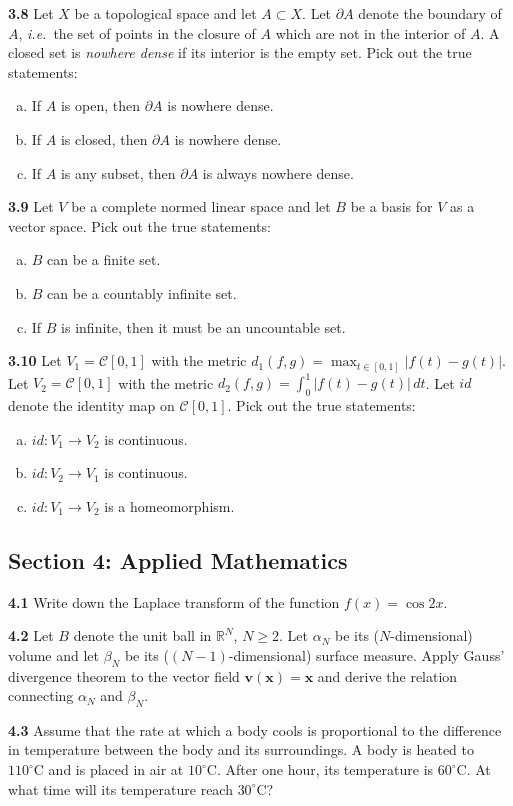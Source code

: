 \documentclass[11pt,a4paper]{article}
\newcommand{\R}{\mathbb{R}}
\newcommand{\examsec}[1]{%
  \subsection*{#1}
  \vspace{-2pt}
}
\newcommand{\qitem}[1]{\par\medskip\noindent\textbf{#1}\hspace{0.5em}}
\begin{document}
\qitem{3.8} Let $X$ be a topological space and let $A \subset X$. Let $\partial A$ denote the boundary of $A$, \emph{i.e.}\ the set of points in the closure of $A$ which are not in the interior of $A$. A closed set is \emph{nowhere dense} if its interior is the empty set. Pick out the true statements:
\begin{enumerate}[(a)]
  \item If $A$ is open, then $\partial A$ is nowhere dense.
  \item If $A$ is closed, then $\partial A$ is nowhere dense.
  \item If $A$ is any subset, then $\partial A$ is always nowhere dense.
\end{enumerate}

\qitem{3.9} Let $V$ be a complete normed linear space and let $B$ be a basis for $V$ as a vector space. Pick out the true statements:
\begin{enumerate}[(a)]
  \item $B$ can be a finite set.
  \item $B$ can be a countably infinite set.
  \item If $B$ is infinite, then it must be an uncountable set.
\end{enumerate}

\qitem{3.10} Let $V_1 = \mathcal{C}[0, 1]$ with the metric $d_1(f, g) = \max_{t \in [0, 1]} |f(t) - g(t)|$. Let $V_2 = \mathcal{C}[0, 1]$ with the metric $d_2(f, g) = \int_0^1 |f(t) - g(t)|\,dt$. Let $id$ denote the identity map on $\mathcal{C}[0, 1]$. Pick out the true statements:
\begin{enumerate}[(a)]
  \item $id : V_1 \to V_2$ is continuous.
  \item $id : V_2 \to V_1$ is continuous.
  \item $id : V_1 \to V_2$ is a homeomorphism.
\end{enumerate}

\examsec{Section 4: Applied Mathematics}

\qitem{4.1} Write down the Laplace transform of the function $f(x) = \cos 2x$.

\qitem{4.2} Let $B$ denote the unit ball in $\R^N$, $N \ge 2$. Let $\alpha_N$ be its ($N$-dimensional) volume and let $\beta_N$ be its ($(N-1)$-dimensional) surface measure. Apply Gauss' divergence theorem to the vector field $\mathbf{v}(\mathbf{x}) = \mathbf{x}$ and derive the relation connecting $\alpha_N$ and $\beta_N$.

\qitem{4.3} Assume that the rate at which a body cools is proportional to the difference in temperature between the body and its surroundings. A body is heated to $110^\circ\mathrm{C}$ and is placed in air at $10^\circ\mathrm{C}$. After one hour, its temperature is $60^\circ\mathrm{C}$. At what time will its temperature reach $30^\circ\mathrm{C}$?
\end{document}

